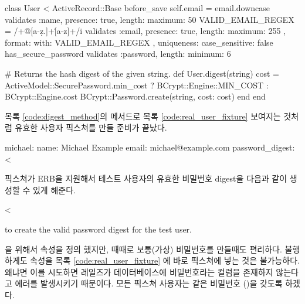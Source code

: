 \begin{codelisting} \label{code:digest_method}  

\begin{code} class User < ActiveRecord::Base before_save { self.email = email.downcase } validates :name, presence: true, length: { maximum: 50 } VALID_EMAIL_REGEX = /\A[\w+\-.]+@[a-z\d\-.]+\.[a-z]+\z/i validates :email, presence: true, length: { maximum: 255 }, format: { with: VALID_EMAIL_REGEX }, uniqueness: { case_sensitive: false } has_secure_password validates :password, length: { minimum: 6 } 

# Returns the hash digest of the given string. def User.digest(string) cost = ActiveModel::SecurePassword.min_cost ? BCrypt::Engine::MIN_COST : BCrypt::Engine.cost BCrypt::Password.create(string, cost: cost) end end \end{code} \end{codelisting} 

목록 \ref{code:digest_method}의  메서드로 목록 \ref{code:real_user_fixture} 보여지는 것처럼 유효한 사용자 픽스쳐를 만들 준비가 끝났다. 

\begin{codelisting} \label{code:real_user_fixture}  

\begin{code} michael: name: Michael Example email: michael@example.com password_digest: < \end{code} \end{codelisting} 

\noindent 픽스쳐가 ERB을 지원해서 테스트 사용자의 유효한 비밀번호 digest을 다음과 같이 생성할 수 있게 해준다. 

\begin{code} < \end{code} 

\noindent to create the valid password digest for the test user. 

을 위해서  속성을 정의 했지만, 때때로 보통(가상) 비밀번호를 만들때도 편리하다. 불행하게도  속성을 목록 \ref{code:real_user_fixture} 에 바로 픽스쳐에 넣는 것은 불가능하다. 왜냐면 이를 시도하면 레일즈가 데이터베이스에 비밀번호라는 컬럼을 존재하지 않는다고 에러를 발생시키기 때문이다. 모든 픽스쳐 사용자는 같은 비밀번호 ()을 갖도록 하겠다. 

